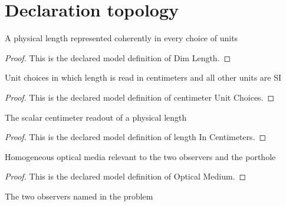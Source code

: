 \section{Declaration topology}
\begin{definition}
  \label{def:physics:phyx-mini-0158:phyxminiproblems-problemphyxmini0158-dimlength}
  A physical length represented coherently in every choice of units
\end{definition}
\begin{proof}
  This is the declared model definition of Dim Length.
\end{proof}
\begin{definition}
  \label{def:physics:phyx-mini-0158:phyxminiproblems-problemphyxmini0158-centimeterunitchoices}
  Unit choices in which length is read in centimeters and all other units are SI
\end{definition}
\begin{proof}
  This is the declared model definition of centimeter Unit Choices.
\end{proof}
\begin{definition}
  \label{def:physics:phyx-mini-0158:phyxminiproblems-problemphyxmini0158-lengthincentimeters}
  The scalar centimeter readout of a physical length
\end{definition}
\begin{proof}
  This is the declared model definition of length In Centimeters.
\end{proof}
\begin{definition}
  \label{def:physics:phyx-mini-0158:phyxminiproblems-problemphyxmini0158-opticalmedium}
  Homogeneous optical media relevant to the two observers and the porthole
\end{definition}
\begin{proof}
  This is the declared model definition of Optical Medium.
\end{proof}
\begin{definition}[Observer]
  \label{def:physics:phyx-mini-0158:phyxminiproblems-problemphyxmini0158-observer}
  The two observers named in the problem
\end{definition}
